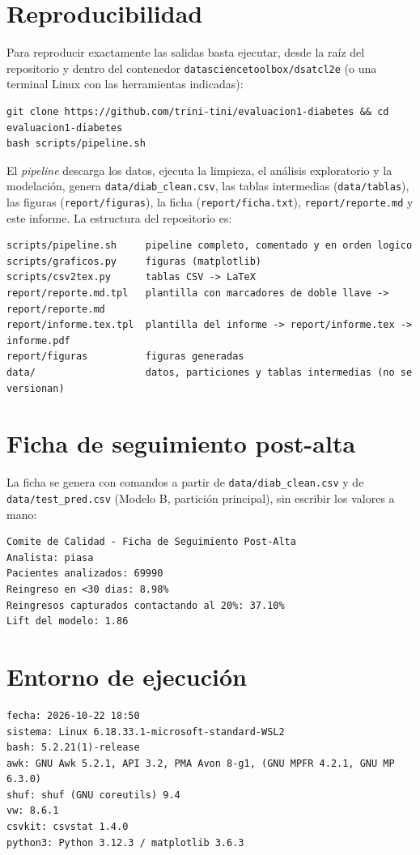\documentclass[11pt,a4paper]{article}
\newcommand{\cod}[1]{\texttt{#1}}
\begin{document}
\section{Reproducibilidad}
Para reproducir exactamente las salidas basta ejecutar, desde la raíz del repositorio y dentro del contenedor \cod{datasciencetoolbox/dsatcl2e} (o una terminal Linux con las herramientas indicadas):
\begin{lstlisting}
git clone https://github.com/trini-tini/evaluacion1-diabetes && cd evaluacion1-diabetes
bash scripts/pipeline.sh
\end{lstlisting}
El \emph{pipeline} descarga los datos, ejecuta la limpieza, el análisis exploratorio y la modelación, genera \cod{data/diab\_clean.csv}, las tablas intermedias (\cod{data/tablas}), las figuras (\cod{report/figuras}), la ficha (\cod{report/ficha.txt}), \cod{report/reporte.md} y este informe. La estructura del repositorio es:
\begin{lstlisting}[columns=fixed]
scripts/pipeline.sh     pipeline completo, comentado y en orden logico
scripts/graficos.py     figuras (matplotlib)
scripts/csv2tex.py      tablas CSV -> LaTeX
report/reporte.md.tpl   plantilla con marcadores de doble llave -> report/reporte.md
report/informe.tex.tpl  plantilla del informe -> report/informe.tex -> informe.pdf
report/figuras          figuras generadas
data/                   datos, particiones y tablas intermedias (no se versionan)
\end{lstlisting}

\clearpage
\appendix
\section{Ficha de seguimiento post-alta}
La ficha se genera con comandos a partir de \cod{data/diab\_clean.csv} y de \cod{data/test\_pred.csv} (Modelo B, partición principal), sin escribir los valores a mano:
\begin{lstlisting}
Comite de Calidad - Ficha de Seguimiento Post-Alta
Analista: piasa
Pacientes analizados: 69990
Reingreso en <30 dias: 8.98%
Reingresos capturados contactando al 20%: 37.10%
Lift del modelo: 1.86
\end{lstlisting}

\section{Entorno de ejecución}\label{app:entorno}
\begin{lstlisting}
fecha: 2026-10-22 18:50
sistema: Linux 6.18.33.1-microsoft-standard-WSL2
bash: 5.2.21(1)-release
awk: GNU Awk 5.2.1, API 3.2, PMA Avon 8-g1, (GNU MPFR 4.2.1, GNU MP 6.3.0)
shuf: shuf (GNU coreutils) 9.4
vw: 8.6.1
csvkit: csvstat 1.4.0
python3: Python 3.12.3 / matplotlib 3.6.3
\end{lstlisting}
\end{document}
